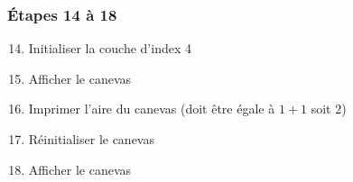 \documentclass[a11paper, 11pt]{article}
\begin{document}
\subsubsection{Étapes 14 à 18}
\begin{enumerate}
  \setcounter{enumi}{13}
  \item Initialiser la couche d'index 4
  \item Afficher le canevas
  \item Imprimer l'aire du canevas (doit être égale à $1+1$ soit $2$)
  \item Réinitialiser le canevas
  \item Afficher le canevas
\end{enumerate}


\end{document}
